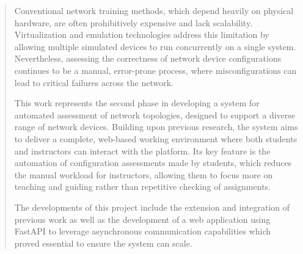 \begin{abstract} 

Conventional network training methods, which depend heavily on physical hardware, are often prohibitively expensive and lack scalability. 
Virtualization and emulation technologies address this limitation by allowing multiple simulated devices to run concurrently 
on a single system. Nevertheless, assessing the correctness of network device configurations continues to be a manual, 
error-prone process, where misconfigurations can lead to critical failures across the network.

This work represents the second phase in developing a system for automated assessment of network topologies, designed to support 
a diverse range of network devices. Building upon previous research, the system aims to deliver a complete, web-based working 
environment where both students and instructors can interact with the platform. Its key feature is the automation of configuration 
assessments made by students, which reduces the manual workload for instructors, allowing them to focus more on teaching and guiding 
rather than repetitive checking of assignments.

The developments of this project include the extension and integration of previous work as well as the development of a web 
application using FastAPI to leverage asynchronous communication capabilities which proved essential to ensure the system can 
scale.


\end{abstract}



\tableofcontents %

\addvspacetoc{0.3cm}


\listoffigures %




